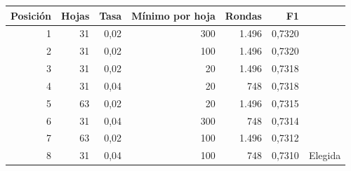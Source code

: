 
\begin{tabular}{rrrrrrl}
\toprule
Posición & Hojas & Tasa & Mínimo por hoja & Rondas & F1 &  \\
\midrule
1 & 31 & 0,02 & 300 & 1.496 & 0,7320 & \\
2 & 31 & 0,02 & 100 & 1.496 & 0,7320 & \\
3 & 31 & 0,02 & 20 & 1.496 & 0,7318 & \\
4 & 31 & 0,04 & 20 & 748 & 0,7318 & \\
5 & 63 & 0,02 & 20 & 1.496 & 0,7315 & \\
6 & 31 & 0,04 & 300 & 748 & 0,7314 & \\
7 & 63 & 0,02 & 100 & 1.496 & 0,7312 & \\
8 & 31 & 0,04 & 100 & 748 & 0,7310 & Elegida\\
\bottomrule
\end{tabular}
